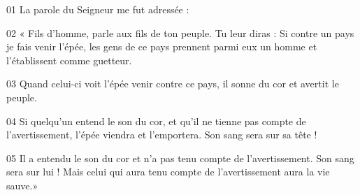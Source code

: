 01 La parole du Seigneur me fut adressée :

02 « Fils d’homme, parle aux fils de ton peuple. Tu leur diras : Si contre un pays je fais venir l’épée, les gens de ce pays prennent parmi eux un homme et l’établissent comme guetteur.

03 Quand celui-ci voit l’épée venir contre ce pays, il sonne du cor et avertit le peuple.

04 Si quelqu’un entend le son du cor, et qu’il ne tienne pas compte de l’avertissement, l’épée viendra et l’emportera. Son sang sera sur sa tête !

05 Il a entendu le son du cor et n’a pas tenu compte de l’avertissement. Son sang sera sur lui ! Mais celui qui aura tenu compte de l’avertissement aura la vie sauve.»
